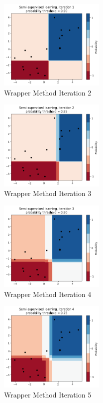\begin{figure}[H]
    \centering
    \includegraphics[width=0.45\textwidth]{images/img6.png}
    \caption{Wrapper Method Iteration 2}
    \label{fig:img6}
\end{figure}

\begin{figure}[H]
    \centering
    \includegraphics[width=0.45\textwidth]{images/img7.png}
    \caption{Wrapper Method Iteration 3}
    \label{fig:img7}
\end{figure}

\begin{figure}[H]
    \centering
    \includegraphics[width=0.45\textwidth]{images/img8.png}
    \caption{Wrapper Method Iteration 4}
    \label{fig:img8}
\end{figure}

\begin{figure}[H]
    \centering
    \includegraphics[width=0.45\textwidth]{images/img9.png}
    \caption{Wrapper Method Iteration 5}
    \label{fig:img9}
\end{figure}

